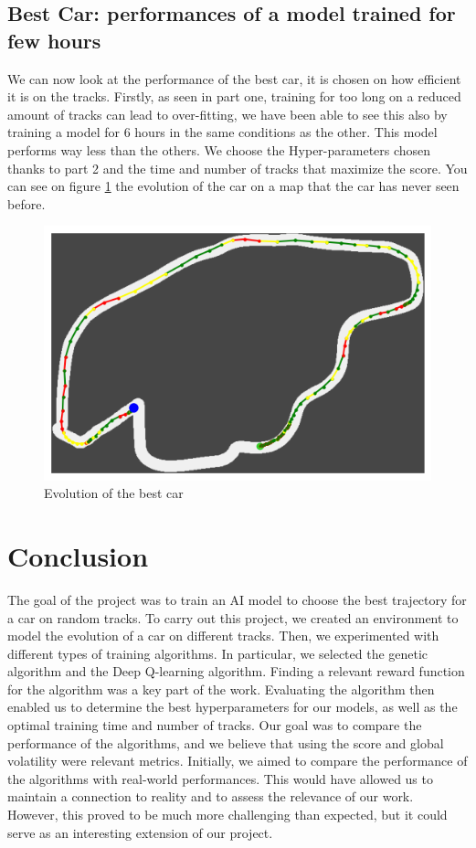 \documentclass[11pt,a4paper]{article}
\newcounter{fig}
\begin{document}
		\subsection*{Best Car: performances of a model trained for few hours }
        We can now look at the performance of the best car, it is chosen on how efficient it is on the tracks. Firstly, as seen in part one, training for too long on a reduced amount of tracks can lead to over-fitting, we have been able to see this also by training a model for $6$ hours in the same conditions as the other. This model performs way less than the others. We choose the Hyper-parameters chosen thanks to part 2 and the time and number of tracks that maximize the score. You can see on figure \ref{figure:Evolution of best car} the evolution of the car on a map that the car has never seen before. 
        \begin{figure}[h]
            \centering
            \includegraphics[width=0.5\linewidth]{image.png}
            \caption{Evolution of the best car}
            \label{figure:Evolution of best car}
        \end{figure}
    
    
    \section*{Conclusion}

The goal of the project was to train an AI model to choose the best trajectory for a car on random tracks. To carry out this project, we created an environment to model the evolution of a car on different tracks. Then, we experimented with different types of training algorithms. In particular, we selected the genetic algorithm and the Deep Q-learning algorithm.
Finding a relevant reward function for the algorithm was a key part of the work. Evaluating the algorithm then enabled us to determine the best hyperparameters for our models, as well as the optimal training time and number of tracks. Our goal was to compare the performance of the algorithms, and we believe that using the score and global volatility were relevant metrics.
Initially, we aimed to compare the performance of the algorithms with real-world performances. This would have allowed us to maintain a connection to reality and to assess the relevance of our work. However, this proved to be much more challenging than expected, but it could serve as an interesting extension of our project.
\end{document}
